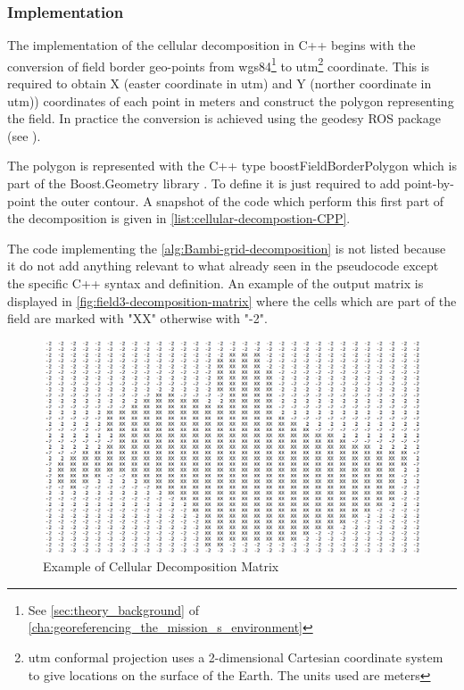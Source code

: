 \subsubsection{Implementation} %
\label{ssub:implementation}
The implementation of the cellular decomposition in C++ begins with the conversion of field border geo-points from \acrshort{wgs84}\footnote{See \autoref{sec:theory_background} of \autoref{cha:georeferencing_the_mission_s_environment}} to \acrshort{utm}\footnote{\acrfull{utm} conformal projection uses a 2-dimensional Cartesian coordinate system to give locations on the surface of the Earth. The units used are meters} coordinate. This is required to obtain X (easter coordinate in \acrshort{utm}) and Y (norther coordinate in \acrshort{utm})) coordinates of each point in meters and construct the polygon representing the field.
In practice the conversion is achieved using the \textsf{geodesy} ROS package (see \cite{geodesyROS}).\par
The polygon is represented with the C++ type \textsf{boostFieldBorderPolygon} which is part of the \textsf{Boost.Geometry} library \cite{boostGeometryLib}. To define it is just required to add point-by-point the outer contour. A snapshot of the code which perform this first part of the decomposition is given in \autoref{list:cellular-decompostion-CPP}.\par
The code implementing the \autoref{alg:Bambi-grid-decomposition} is not listed because it do not add anything relevant to what already seen in the pseudocode except the specific C++ syntax and definition. An example of the output matrix is displayed in \autoref{fig:field3-decomposition-matrix} where the cells which are part of the field are marked with "XX" otherwise with "-2".

\begin{figure}[ht]
    \centering
    \includegraphics[width=1\textwidth]{figures/C3/Field3/Field3-decomposition-matrix.png}
    \caption{Example of Cellular Decomposition Matrix}
    \label{fig:field3-decomposition-matrix}
\end{figure}

